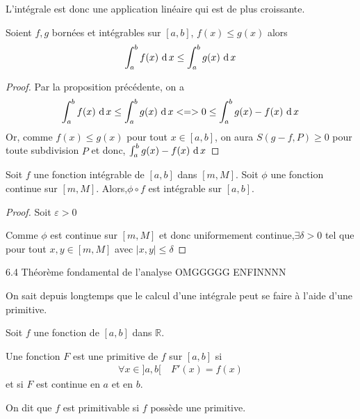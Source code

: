 L'intégrale est donc une application linéaire qui est de plus croissante.

\begin{proposition}
    Soient $f,g$ bornées et intégrables sur $[a,b]$, $f(x)\le g(x)$ alors 
    \begin{align*}
        \int_a^bf(x)\,\operatorname{d} x \le \int_a^bg(x)\,\operatorname{d} x
    \end{align*}
\end{proposition}

\begin{proof}
    Par la proposition précédente, on a 
    \begin{align*}
        \int_a^bf(x)\intd x \le \int_a^bg(x)\intd x <=> %
        0 \le \int_a^bg(x)-f(x)\intd x
    \end{align*}
    Or, comme $f(x)\le g(x)$ pour tout $x \in [a,b]$, on aura
    $S(g-f,P)\ge 0$ pour toute subdivision $P$ et donc, $\int_a^bg(x)-f(x)\,\operatorname{d} x$
\end{proof}

\begin{proposition}
    Soit $f$ une fonction intégrable de $[a,b]$ dans $[m,M]$.
    Soit $\phi$ une fonction continue sur $[m,M]$. Alors,$\phi\circ f$ est intégrable sur $[a,b]$.
\end{proposition}

\begin{proof}
    Soit $\varepsilon >0$

    Comme $\phi$ est continue sur $[m,M]$ et donc uniformement continue,$\exists\delta >0$ tel que pour tout $x,y \in[m,M]$ avec $|x,y| \le \delta$
\end{proof}



\begin{section}{6.4 Théorème fondamental de l'analyse}
OMGGGGG ENFINNNN

On sait depuis longtemps que le calcul d'une intégrale peut se faire à l'aide d'une primitive.

\begin{definition}
    Soit $f$ une fonction de $[a,b]$ dans $\mathbb{R}$.

    Une fonction $F$ est une primitive de $f$ sur $[a,b]$ si
    \begin{align*}
       \forall x\in ]a,b[  \quad F'(x) = f(x)
    \end{align*}
    et si $F$ est continue en $a$ et en $b$.
\end{definition}
    On dit que $f$ est primitivable si $f$ possède une primitive.
\end{section}

